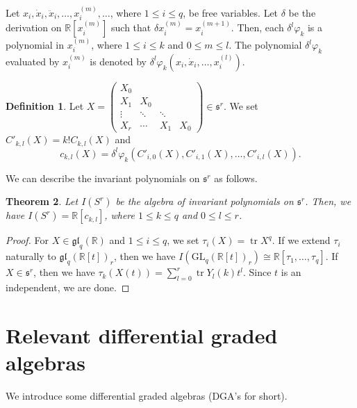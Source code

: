 \documentclass[12pt]{amsart}
\newcommand{\R}{{\mathbb R}}
\DeclareMathOperator{\tr}{tr}
\newcommand{\gl}{\mathfrak{gl}}
\newcommand{\GL}{\mathrm{GL}}
\newtheorem{theorem}{Theorem}[section]
\theoremstyle{definition}
\newtheorem{definition}[theorem]{Definition}
\theoremstyle{remark}
\begin{document}
Let $x_i,\dot{x}_i,\ddot{x}_i,\ldots,x^{(m)}_i,\ldots$, where $1\leq i\leq q$, be free variables.
Let $\delta$ be the derivation on $\R[x^{(m)}_i]$ such that $\delta x^{(m)}_i=x^{(m+1)}_i$.
Then, each $\delta^l\varphi_k$ is a polynomial in $x^{(m)}_i$, where $1\leq i\leq k$ and $0\leq m\leq l$.
The polynomial $\delta^l\varphi_k$ evaluated by $x^{(m)}_i$ is denoted by $\delta^l\varphi_k(x_i,\dot{x}_i,\ldots,x^{(l)}_i)$.

\begin{definition}
\label{def4.4}
Let $X=\begin{pmatrix}
X_0\\
X_1 & X_0\\
\vdots & \ddots & \ddots\\
X_r & \cdots & X_1 &  X_0
\end{pmatrix}\in\mathfrak{s}^r$.
We set $C'_{k,l}(X)=k!C_{k,l}(X)$ and
\[
c_{k,l}(X)=\delta^l\varphi_k(C'_{i,0}(X),C'_{i,1}(X),\ldots,C'_{i,l}(X)).
\]
\end{definition}

We can describe the invariant polynomials on $\mathfrak{s}^r$ as follows.

\begin{theorem}
Let $I(S^r)$ be the algebra of invariant polynomials on $\mathfrak{s}^r$.
Then, we have $I(S^r)=\R[c_{k,l}]$, where $1\leq k\leq q$ and $0\leq l\leq r$.
\end{theorem}
\begin{proof}
For $X\in\gl_q(\R)$ and $1\leq i\leq q$, we set $\tau_i(X)=\tr X^q$.
If we extend $\tau_i$ naturally to $\gl_q(\R[t])_r$, then we have $I(\GL_q(\R[t])_r)\cong\R[\tau_1,\ldots,\tau_q]$.
If $X\in\mathfrak{s}^r$, then we have $\tau_k(X(t))=\sum_{l=0}^r\tr Y_l(k)t^l$.
Since $t$ is an independent, we are done.
\end{proof}

\section{Relevant differential graded algebras}
We introduce some differential graded algebras (DGA's for short).
\end{document}
